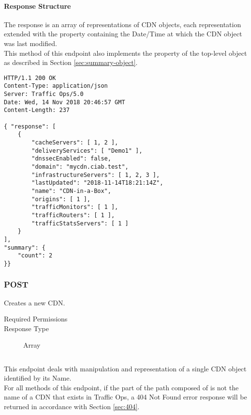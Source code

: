 \paragraph{Response Structure}
The response is an array of representations of CDN objects, each representation
extended with the  property containing the Date/Time at which
the CDN object was last modified.\\
This method of this endpoint also implements the  property of the
top-level  object as described in Section
\ref{sec:summary-object}.

\newpage{}

\begin{codelisting}
\begin{verbatim}
HTTP/1.1 200 OK
Content-Type: application/json
Server: Traffic Ops/5.0
Date: Wed, 14 Nov 2018 20:46:57 GMT
Content-Length: 237

{ "response": [
	{
		"cacheServers": [ 1, 2 ],
		"deliveryServices": [ "Demo1" ],
		"dnssecEnabled": false,
		"domain": "mycdn.ciab.test",
		"infrastructureServers": [ 1, 2, 3 ],
		"lastUpdated": "2018-11-14T18:21:14Z",
		"name": "CDN-in-a-Box",
		"origins": [ 1 ],
		"trafficMonitors": [ 1 ],
		"trafficRouters": [ 1 ],
		"trafficStatsServers": [ 1 ]
	}
],
"summary": {
	"count": 2
}}
\end{verbatim}
\end{codelisting}

\subsubsection{POST}
Creates a new CDN.
\begin{description}
	\item[Required Permissions] 
	\item[Response Type] Array
\end{description}

\subsection{}
This endpoint deals with manipulation and representation of a single CDN object
identified by its Name.\\
For all methods of this endpoint, if the part of the path composed of
 is not the name of a CDN that exists in Traffic Ops, a 404 Not
Found error response will be returned in accordance with Section \ref{sec:404}.

\subsection{}

